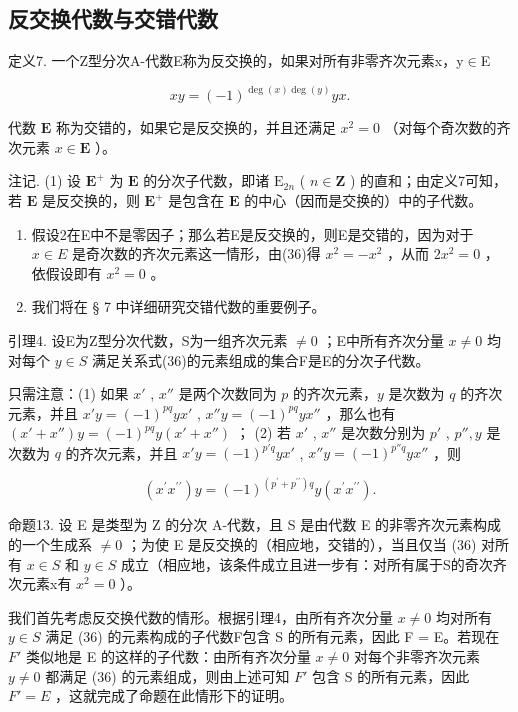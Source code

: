 \subsection{反交换代数与交错代数}

定义7. 一个Z型分次A-代数E称为反交换的，如果对所有非零齐次元素x，y\ensuremath{\in}E

\[
x y = (- 1) ^ {\deg (x) \deg (y)} y x.\tag{36}
\]

代数 \(\mathbf{E}\) 称为交错的，如果它是反交换的，并且还满足 \(x^{2} = 0\) （对每个奇次数的齐次元素 \(x\in \mathbf{E}\) ）。

注记. (1) 设 \(\mathbf{E}^{+}\) 为 \(\mathbf{E}\) 的分次子代数，即诸 \(\mathrm{E}_{2n}\) ( \(n \in \mathbf{Z}\) ) 的直和；由定义7可知，若 \(\mathbf{E}\) 是反交换的，则 \(\mathbf{E}^{+}\) 是包含在 \(\mathbf{E}\) 的中心（因而是交换的）中的子代数。

\begin{enumerate}
\def\labelenumi{(\arabic{enumi})}
\setcounter{enumi}{1}
\item
  假设2在E中不是零因子；那么若E是反交换的，则E是交错的，因为对于 \(x \in E\) 是奇次数的齐次元素这一情形，由(36)得 \(x^{2} = -x^{2}\) ，从而 \(2x^{2} = 0\) ，依假设即有 \(x^{2} = 0\) 。
\item
  我们将在 § 7 中详细研究交错代数的重要例子。
\end{enumerate}

引理4. 设E为Z型分次代数，S为一组齐次元素 \(\neq0\) ；E中所有齐次分量 \(x\neq0\) 均对每个 \(y\in S\) 满足关系式(36)的元素组成的集合F是E的分次子代数。

只需注意：(1) 如果 \(x'\) , \(x''\) 是两个次数同为 \(p\) 的齐次元素，\(y\) 是次数为 \(q\) 的齐次元素，并且 \(x'y = (-1)^{pq}yx'\) , \(x''y = (-1)^{pq}yx''\) ，那么也有 \((x' + x'')y = (-1)^{pq}y(x' + x'')\) ； (2) 若 \(x'\) , \(x''\) 是次数分别为 \(p'\) , \(p'', y\) 是次数为 \(q\) 的齐次元素，并且 \(x'y = (-1)^{p'q}yx'\) , \(x''y = (-1)^{p''q}yx''\) ，则

\[
(x ^ {\prime} x ^ {\prime \prime}) y = (- 1) ^ {(p ^ {\prime} + p ^ {\prime \prime}) q} y (x ^ {\prime} x ^ {\prime \prime}).
\]

命题13. 设 E 是类型为 Z 的分次 A-代数，且 S 是由代数 E 的非零齐次元素构成的一个生成系 \(\neq0\) ；为使 E 是反交换的（相应地，交错的），当且仅当 (36) 对所有 \(x\in S\) 和 \(y\in S\) 成立（相应地，该条件成立且进一步有：对所有属于S的奇次齐次元素x有 \(x^{2}=0\) ）。

我们首先考虑反交换代数的情形。根据引理4，由所有齐次分量 \(x \neq 0\) 均对所有 \(y \in S\) 满足 (36) 的元素构成的子代数F包含 S 的所有元素，因此 F = E。若现在 \(F'\) 类似地是 E 的这样的子代数：由所有齐次分量 \(x \neq 0\) 对每个非零齐次元素 \(y \neq 0\) 都满足 (36) 的元素组成，则由上述可知 \(F'\) 包含 S 的所有元素，因此 \(F' = E\) ，这就完成了命题在此情形下的证明。

